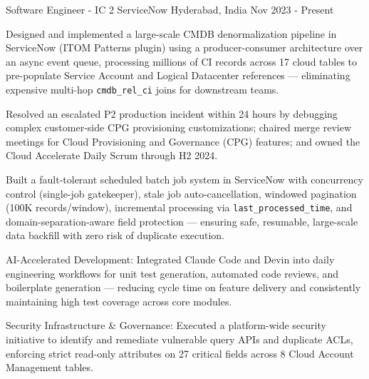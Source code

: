 

\begin{cventries}


\cventry
    {Software Engineer - IC 2} %
    {ServiceNow} %
    {Hyderabad, India} %
    {Nov 2023 -  Present} %
    {
     \begin{cvitems} %
        \item {Designed and implemented a large-scale CMDB denormalization pipeline in ServiceNow (ITOM Patterns plugin) using a producer-consumer architecture over an async event queue, processing millions of CI records across 17 cloud tables to pre-populate Service Account and Logical Datacenter references — eliminating expensive multi-hop \texttt{cmdb\_rel\_ci} joins for downstream teams.}
        \item {Resolved an escalated P2 production incident within 24 hours by debugging complex customer-side CPG provisioning customizations; chaired merge review meetings for Cloud Provisioning and Governance (CPG) features; and owned the Cloud Accelerate Daily Scrum through H2 2024.}
        \item {Built a fault-tolerant scheduled batch job system in ServiceNow with concurrency control (single-job gatekeeper), stale job auto-cancellation, windowed pagination (100K records/window), incremental processing via \texttt{last\_processed\_time}, and domain-separation-aware field protection — ensuring safe, resumable, large-scale data backfill with zero risk of duplicate execution.}
        \item {AI-Accelerated Development: Integrated Claude Code and Devin into daily engineering workflows for unit test generation, automated code reviews, and boilerplate generation — reducing cycle time on feature delivery and consistently maintaining high test coverage across core modules.}
        \item {Security Infrastructure \& Governance: Executed a platform-wide security initiative to identify and remediate vulnerable query APIs and duplicate ACLs, enforcing strict read-only attributes on 27 critical fields across 8 Cloud Account Management tables.}

\end{cvitems}}
\end{cventries}
